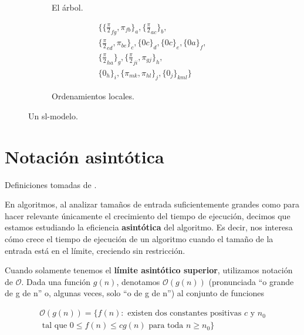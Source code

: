 \begin{figure}
  \begin{subfigure}{0.4\textwidth}
    \caption{El \'arbol.}
  \end{subfigure}
  \begin{subfigure}{0.4\textwidth}
    \begin{equation*}
      \begin{split}
        \{\{\frac{\pi}{2}_{fg}, \pi_{fb}\}_a, \{\frac{\pi}{2}_{ac}\}_b, \\
          \{\frac{\pi}{2}_{ed}, \pi_{be}\}_c, \{0c\}_d, \{0c\}_e, \{0a\}_f, \\
          \{\frac{\pi}{2}_{ha}\}_g, \{\frac{\pi}{2}_{ji}, \pi_{gj}\}_h, \\
          \{0_h\}_i, \{\pi_{mk},\pi_{hl}\}_j, \{0_j\}_{kml}\}
      \end{split}
    \end{equation*}
    \caption{Ordenamientos locales.}
  \end{subfigure}
  \caption{Un sl-modelo.}
\end{figure}

\section{Notaci\'on asint\'otica}

Definiciones tomadas de \cite{cormenetal}.

En algoritmos, al analizar tamaños de entrada suficientemente grandes como para hacer relevante \'unicamente el crecimiento del tiempo de ejecuci\'on, decimos que estamos estudiando la eficiencia \textbf{asint\'otica} del algoritmo. Es decir, nos interesa c\'omo crece el tiempo de ejecuci\'on de un algoritmo cuando el tamaño de la entrada est\'a en el l\'imite, creciendo sin restricci\'on.

\begin{definition}
Cuando solamente tenemos el \textbf{l\'imite asint\'otico superior}, utilizamos notaci\'on de $\mathcal{O}$. Dada una funci\'on $g(n)$, denotamos $\mathcal{O}(g(n))$ (pronunciada ``o grande de g de n'' o, algunas veces, solo ``o de g de n'') al conjunto de funciones

\begin{equation*}
\begin{split}
\mathcal{O}(g(n)) = \{f(n): \text{ existen dos constantes positivas } c \text{ y } n_0 \\
\text{ tal que } 0 \leq f(n) \leq cg(n) \text{ para toda } n \geq n_0\}
\end{split}
\end{equation*}
\end{definition}

